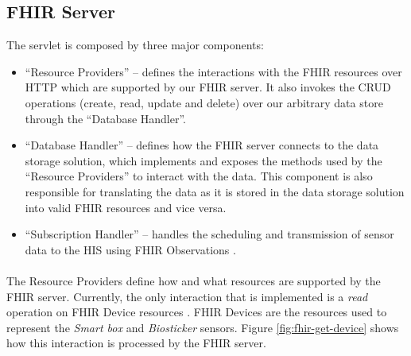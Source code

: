 \subsection{FHIR Server} 

The servlet is composed by three major components:

\begin{itemize}
    \item ``Resource Providers'' -- defines the interactions with the \acs{FHIR} resources over \acs{HTTP} which are supported by our \acs{FHIR} server. It also invokes the \acs{CRUD} operations (create, read, update and delete) over our arbitrary data store through the ``Database Handler''.
    \item ``Database Handler'' -- defines how the \acs{FHIR} server connects to the data storage solution, which implements and exposes the methods used by the ``Resource Providers'' to interact with the data. This component is also responsible for translating the data as it is stored in the data storage solution into valid \acs{FHIR} resources and vice versa.
    \item ``Subscription Handler'' -- handles the scheduling and transmission of sensor data to the \acs{HIS} using \acs{FHIR} Observations \cite{fhir}.
\end{itemize}

\paragraph{} The Resource Providers define how and what resources are supported by the \acs{FHIR} server. Currently, the only interaction that is implemented is a \textit{read} operation \cite{fhir} on \acs{FHIR} Device resources \cite{fhir}. \acs{FHIR} Devices are the resources used to represent the \textit{Smart box} and \textit{Biosticker} sensors. Figure \ref{fig:fhir-get-device} shows how this interaction is processed by the \acs{FHIR} server.

